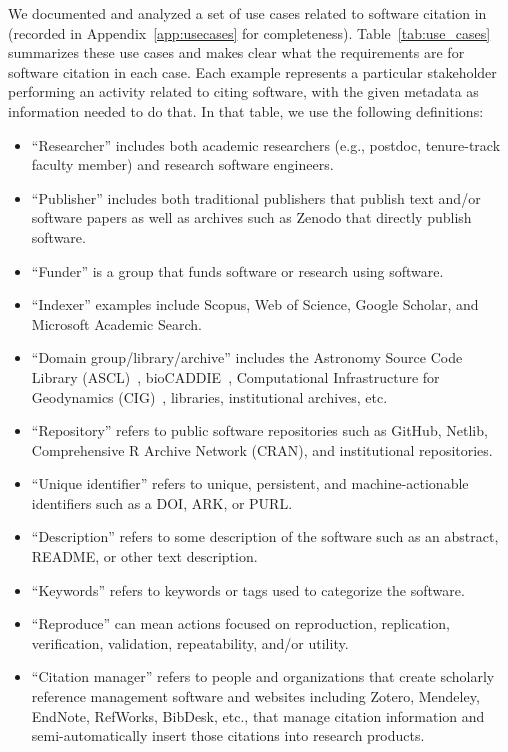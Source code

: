 \documentclass[12pt, oneside]{amsart}
\begin{document}
We documented and analyzed a set of use cases related to software citation
in \cite{SC-Use-Cases} (recorded in Appendix~\ref{app:usecases} for completeness).
Table~\ref{tab:use_cases} summarizes these use cases and
makes clear what the requirements are for software citation in each case.
Each example represents a particular stakeholder performing an activity
related to citing software, with the given metadata as information needed to
do that. In that table, we use the following definitions:
\begin{itemize}

\item ``Researcher'' includes both academic researchers (e.g., postdoc,
tenure-track faculty member) and research software engineers.

\item ``Publisher'' includes both traditional publishers that publish text
and\slash or software papers as well as archives such as Zenodo that directly
publish software.

\item ``Funder'' is a group that funds software or research using software.

\item ``Indexer'' examples include Scopus, Web of Science, Google Scholar,
and Microsoft Academic Search.

\item ``Domain group\slash library\slash archive'' includes the Astronomy Source Code Library (ASCL)~\cite{ascl},
bioCADDIE~\cite{bioCADDIE}, Computational Infrastructure for Geodynamics (CIG)~\cite{CIG}, libraries, institutional archives, etc.

\item ``Repository'' refers to public software repositories such as GitHub, Netlib, Comprehensive R Archive
Network (CRAN), and institutional repositories.

\item ``Unique identifier'' refers to unique, persistent, and machine-actionable identifiers such as a DOI, ARK, or PURL.

\item ``Description'' refers to some description of the software such as an abstract, README, or other text description.

\item ``Keywords'' refers to keywords or tags used to categorize the software.

\item ``Reproduce'' can mean actions focused on reproduction, replication, verification, validation, repeatability, and\slash or utility.

\item ``Citation manager'' refers to people and organizations that create scholarly reference
management software and websites including Zotero, Mendeley, EndNote, RefWorks, BibDesk, etc.,
that manage citation information and semi-automatically insert those citations into research products.

\end{itemize}
\end{document}
